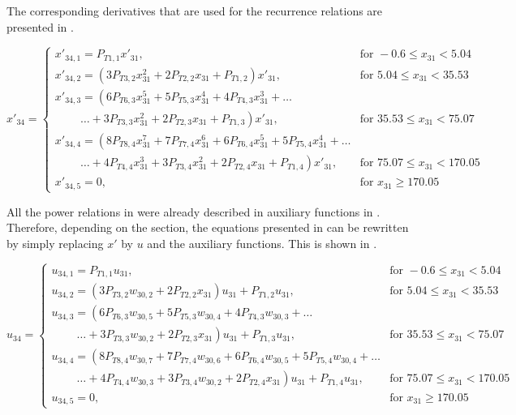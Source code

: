 The corresponding derivatives that are used for the recurrence relations are presented in .

\begin{equation}\label{eq:TCondDerAux}
x'_{34}=\begin{cases}
x'_{34,1}=P_{T 1,1}x'_{31}, & \text{for } -0.6 \leq x_{31} < 5.04  \\
x'_{34,2}=\left(3P_{T 3,2}x_{31}^{2}+2P_{T 2,2}x_{31}+P_{T 1,2}\right)x'_{31}, &  \text{for } 5.04\leq x_{31} < 35.53   \\
x'_{34,3}=\left(6 P_{T 6,3}x_{31}^{5}+5P_{T 5,3}x_{31}^{4}+4P_{T 4,3}x_{31}^{3}+ \dots
\right. \\
\qquad\  \left. \dotsc +3P_{T 3,3}x_{31}^{2}+2P_{T 2,3}x_{31}+P_{T 1,3}\right)x'_{31}, &  \text{for } 35.53\leq x_{31} < 75.07   \\
x'_{34,4}=\left(8 P_{T 8,4}x_{31}^{7}+7P_{T 7,4}x_{31}^{6}+6P_{T 6,4}x_{31}^{5}
+5P_{T 5,4}x_{31}^{4}+ \dots \right. \\
\qquad\  \left. \dotsc +4P_{T 4,4}x_{31}^{3}+3P_{T 3,4}x_{31}^{2}+2P_{T 2,4}x_{31}+P_{T 1,4}\right)x'_{31}, &  \text{for } 75.07\leq x_{31} < 170.05   \\
x'_{34,5}=0, &  \text{for }  x_{31} \geq 170.05   
\end{cases}
\end{equation}

All the power relations in  were already described in auxiliary functions in . Therefore, depending on the section, the equations presented in  can be rewritten by simply replacing $x'$ by $u$ and the auxiliary functions. This is shown in .

\begin{equation}\label{eq:TCondAuxF}
u_{34}=\begin{cases}
u_{34,1}=P_{T 1,1}u_{31}, & \text{for } -0.6 \leq x_{31} < 5.04  \\
u_{34,2}=\left(3P_{T 3,2}w_{30,2}+2P_{T 2,2}x_{31}\right)u_{31}+P_{T 1,2}u_{31}, &  \text{for } 5.04\leq x_{31} < 35.53   \\
u_{34,3}=\left(6 P_{T 6,3}w_{30,5}+5P_{T 5,3}w_{30,4}+4P_{T 4,3}w_{30,3}+ \dots
\right. \\
\qquad\  \left. \dotsc +3P_{T 3,3}w_{30,2}+2P_{T 2,3}x_{31}\right)u_{31}+P_{T 1,3}u_{31}, &  \text{for } 35.53\leq x_{31} < 75.07   \\
u_{34,4}=\left(8 P_{T 8,4}w_{30,7}+7P_{T 7,4}w_{30,6}+6P_{T 6,4}w_{30,5}
+5P_{T 5,4}w_{30,4}+ \dots \right. \\
\qquad\  \left. \dotsc +4P_{T 4,4}w_{30,3}+3P_{T 3,4}w_{30,2}+2P_{T 2,4}x_{31}\right)u_{31}+P_{T 1,4}u_{31}, &  \text{for } 75.07\leq x_{31} < 170.05   \\
u_{34,5}=0, &  \text{for }  x_{31} \geq 170.05   
\end{cases}
\end{equation}

